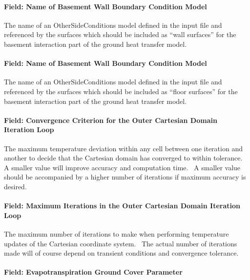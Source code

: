 \paragraph{Field: Name of Basement Wall Boundary Condition Model}\label{field-name-of-basement-wall-boundary-condition-model}

The name of an OtherSideConditions model defined in the input file and referenced by the surfaces which should be included as ``wall surfaces'' for the basement interaction part of the ground heat transfer model.

\paragraph{Field: Name of Basement Wall Boundary Condition Model}\label{field-name-of-basement-wall-boundary-condition-model-1}

The name of an OtherSideConditions model defined in the input file and referenced by the surfaces which should be included as ``floor surfaces'' for the basement interaction part of the ground heat transfer model.

\paragraph{Field: Convergence Criterion for the Outer Cartesian Domain Iteration Loop}\label{field-convergence-criterion-for-the-outer-cartesian-domain-iteration-loop}

The maximum temperature deviation within any cell between one iteration and another to decide that the Cartesian domain has converged to within tolerance.~ A smaller value will improve accuracy and computation time.~ A smaller value should be accompanied by a higher number of iterations if maximum accuracy is desired.

\paragraph{Field: Maximum Iterations in the Outer Cartesian Domain Iteration Loop}\label{field-maximum-iterations-in-the-outer-cartesian-domain-iteration-loop}

The maximum number of iterations to make when performing temperature updates of the Cartesian coordinate system.~ The actual number of iterations made will of course depend on transient conditions and convergence tolerance.

\paragraph{Field: Evapotranspiration Ground Cover Parameter}\label{field-evapotranspiration-ground-cover-parameter-000}

